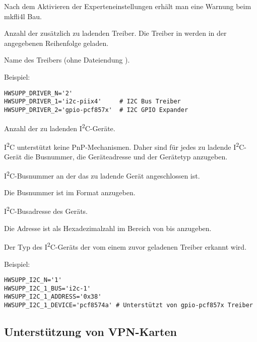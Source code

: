 \begin{description}
\begin{itemize}
  \end{itemize}
  Nach dem Aktivieren der Experteneinstellungen erhält man eine Warnung beim
  mkfli4l Bau. 
  
  Anzahl der zusätzlich zu ladenden Treiber. 
  Die Treiber in  werden in der angegebenen Reihenfolge
  geladen.  

  Name des Treibers (ohne Dateiendung ).

Beispiel:
\begin{verbatim}
HWSUPP_DRIVER_N='2'
HWSUPP_DRIVER_1='i2c-piix4'     # I2C Bus Treiber
HWSUPP_DRIVER_2='gpio-pcf857x'  # I2C GPIO Expander
\end{verbatim}
  
  Anzahl der zu ladenden I\textsuperscript{2}C-Geräte.
  
  I\textsuperscript{2}C unterstützt keine PnP-Mechanismen. 
  Daher sind für jedes zu ladende I\textsuperscript{2}C-Gerät die Busnummer,
  die Geräteadresse und der Gerätetyp anzugeben.  

  I\textsuperscript{2}C-Busnummer an der das zu ladende Gerät angeschlossen ist.
  
  Die Busnummer ist im Format  anzugeben.
  
  I\textsuperscript{2}C-Busadresse des Geräts.
  
  Die Adresse ist als Hexadezimalzahl im Bereich von  bis 
  anzugeben. 

  Der Typ des I\textsuperscript{2}C-Geräts der vom einem zuvor geladenen Treiber
  erkannt wird.
  
Beispiel:
\begin{verbatim}
HWSUPP_I2C_N='1'
HWSUPP_I2C_1_BUS='i2c-1'
HWSUPP_I2C_1_ADDRESS='0x38'
HWSUPP_I2C_1_DEVICE='pcf8574a' # Unterstützt von gpio-pcf857x Treiber 
\end{verbatim}

\subsection {Unterstützung von VPN-Karten}


\end{description}
